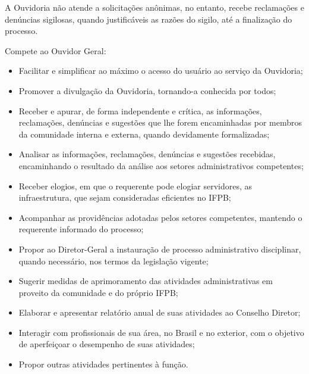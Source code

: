 	A Ouvidoria não atende a solicitações anônimas, no entanto, recebe reclamações e denúncias sigilosas, quando justificáveis as razões do sigilo, até a finalização do processo.

          Compete ao Ouvidor Geral:

\begin{itemize}
\item Facilitar e simplificar ao máximo o acesso do usuário ao serviço da Ouvidoria;

\item Promover a divulgação da Ouvidoria, tornando-a conhecida por todos;

\item Receber e apurar, de forma independente e crítica, as informações, reclamações, denúncias e sugestões que lhe forem encaminhadas por membros da comunidade interna e externa, quando devidamente formalizadas;

\item Analisar as informações, reclamações, denúncias e sugestões recebidas, encaminhando o resultado da análise aos setores administrativos competentes;

\item Receber elogios, em que o requerente pode elogiar servidores, as infraestrutura, que sejam consideradas eficientes no IFPB;

\item Acompanhar as providências adotadas pelos setores competentes, mantendo o requerente informado do processo;

\item Propor ao Diretor-Geral a instauração de processo administrativo disciplinar, quando necessário, nos termos da legislação vigente;

\item Sugerir medidas de aprimoramento das atividades administrativas em proveito da comunidade e do próprio IFPB;

\item Elaborar e apresentar relatório anual de suas atividades ao Conselho Diretor;

\item Interagir com profissionais de sua área, no Brasil e no exterior, com o objetivo de aperfeiçoar o desempenho de suas atividades;

\item Propor outras atividades pertinentes à função.

\end{itemize}


